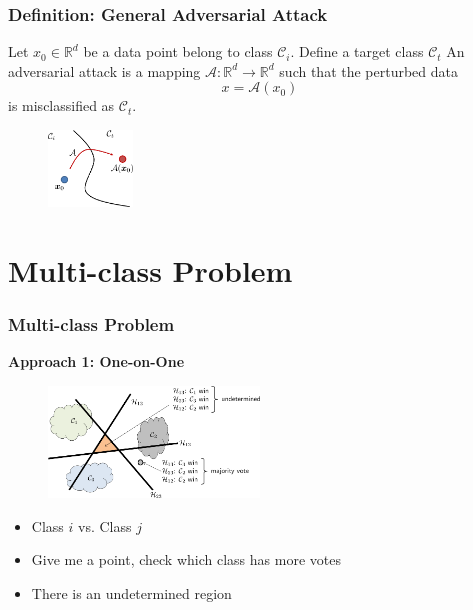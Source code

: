 \documentclass[9pt,dvipsnames]{beamer}
\newenvironment{customtheorem}[1]
{%
	\tcolorbox[
	enhanced,
	colback=blue!5,
	colframe=blue!60!black,
	coltitle=black,
	colbacktitle=blue!5,
	fonttitle=\bfseries,
	attach boxed title to top left={yshift=-2mm, xshift=2mm},
	boxed title style={sharp corners},
	sharp corners,
	title=#1
	]
}
{%
	\endtcolorbox
}
\begin{document}
\begin{frame}
	\frametitle{Definition: General Adversarial Attack}
	\begin{customtheorem}{General Adversarial Attack}
		Let \(x_{0} \in \mathbb{R}^{d}\) be a data point belong to class \(\mathcal{C}_{i}\). Define a target class \(\mathcal{C}_{t}\)
		An adversarial attack is a mapping \(\mathcal{A}: \mathbb{R}^{d} \rightarrow \mathbb{R}^{d}\) such that the
		perturbed data
		$$
		x=\mathcal{A}\left(x_{0}\right)
		$$
		is misclassified as \(\mathcal{C}_{t}\).
	\end{customtheorem}
		\begin{figure}[htbp]
		\centering
		\includegraphics[width=0.2\textwidth]{imgs/adv_overview_10.png}
	\end{figure}
\end{frame}

\section{Multi-class Problem}
\begin{frame}
	\frametitle{Multi-class Problem}
	\textbf{Approach 1: One-on-One}
			\begin{figure}[htbp]
		\centering
		\includegraphics[width=0.5\textwidth]{imgs/adv_overview_11.png}
	\end{figure}
	\begin{itemize}
		\item Class $i$ vs. Class $j$
		\item Give me a point, check which class has more votes
		\item There is an undetermined region
	\end{itemize}
\end{frame}
\end{document}
